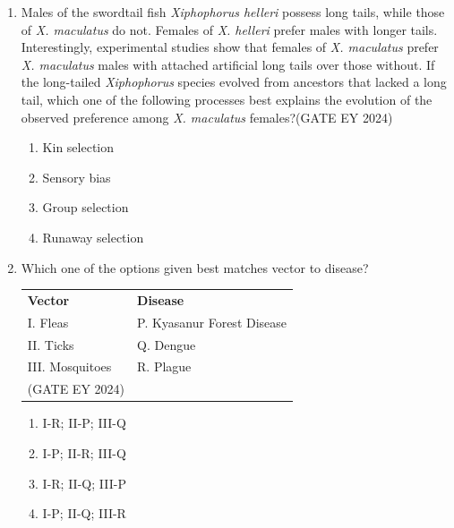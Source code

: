 \begin{enumerate}
\item Males of the swordtail fish \textit{Xiphophorus helleri} possess long tails, while those of \textit{X. maculatus} do not. Females of \textit{X. helleri} prefer males with longer tails. Interestingly, experimental studies show that females of \textit{X. maculatus} prefer \textit{X. maculatus} males with attached artificial long tails over those without. If the long-tailed \textit{Xiphophorus} species evolved from ancestors that lacked a long tail, which one of the following processes best explains the evolution of the observed preference among \textit{X. maculatus} females?\hfill{(GATE EY 2024)}
    \begin{multicols}{2}
    \begin{enumerate}
        \item Kin selection
        \item Sensory bias
        \item Group selection
        \item Runaway selection
    \end{enumerate}
    \end{multicols}

\item Which one of the options given best matches vector to disease? \\
\begin{tabular}{ll}
\textbf{Vector} & \textbf{Disease} \\
I. Fleas & P. Kyasanur Forest Disease \\
II. Ticks & Q. Dengue \\
III. Mosquitoes & R. Plague \\ \hfill{(GATE EY 2024)}
\end{tabular}
    \begin{multicols}{2}
    \begin{enumerate}
        \item I-R; II-P; III-Q
        \item I-P; II-R; III-Q
        \item I-R; II-Q; III-P
        \item I-P; II-Q; III-R
    \end{enumerate}
    \end{multicols}


\end{enumerate}
